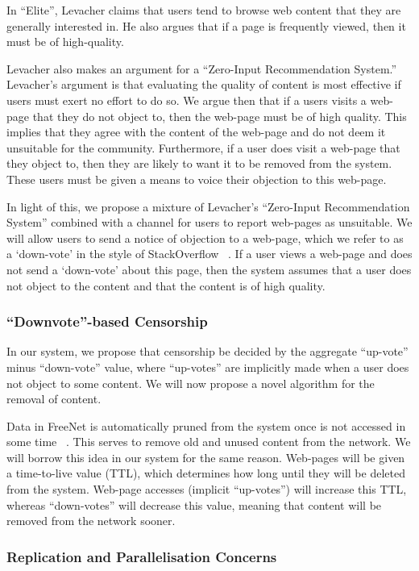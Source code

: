 In ``Elite'', Levacher claims that users tend to browse web content that they are generally interested in. He also argues that if
a page is frequently viewed, then it must be of high-quality.

Levacher also makes an argument for a ``Zero-Input Recommendation System.'' Levacher's argument is that evaluating the quality of
content is most effective if users must exert no effort to do so. We argue then that if a users visits a web-page that they do not
object to, then the web-page must be of high quality. This implies that they agree with the content of the web-page and do not deem
it unsuitable for the community. Furthermore, if a user does visit a web-page that they object to, then they are likely to want it to
be removed from the system. These users must be given a means to voice their objection to this web-page.

In light of this, we propose a mixture of Levacher's ``Zero-Input Recommendation System'' combined with a channel for users to
report web-pages as unsuitable. We will allow users to send a notice of objection to a web-page, which we refer to as a `down-vote' in the
style of StackOverflow ~\cite{stackoverflow}. If a user views a web-page and does not send a `down-vote' about this page, then the
system assumes that a user does not object to the content and that the content is of high quality.

\subsubsection{``Downvote''-based Censorship}

In our system, we propose that censorship be decided by the aggregate ``up-vote'' minus ``down-vote'' value, where ``up-votes'' are implicitly
made when a user does not object to some content. We will now propose a novel algorithm for the removal of content.

Data in FreeNet is automatically pruned from the system once is not accessed in some time ~\cite{freenet}. This serves to remove old and unused
content from the network. We will borrow this idea in our system for the same reason. Web-pages will be given a time-to-live value (TTL),
which determines how long until they will be deleted from the system. Web-page accesses (implicit ``up-votes'') will increase this
TTL, whereas ``down-votes'' will decrease this value, meaning that content will be removed from the network sooner.

\subsubsection{Replication and Parallelisation Concerns}


